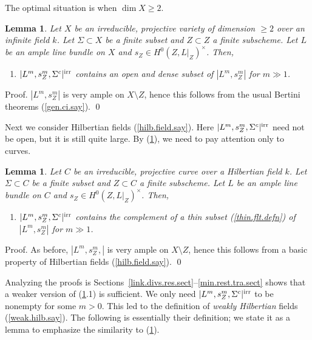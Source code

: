 \documentclass{amsart}
\newtheorem{lem}[thm]{Lemma}
\theoremstyle{definition}
\theoremstyle{remark}
\begin{document}
The optimal situation is when $\dim X\geq 2$.



\begin{lem}\label{bert.f.basic.prop.lem} Let $X$ be an irreducible,  projective variety of dimension $\geq 2$ over an infinite field $k$. Let $\Sigma\subset X$ be a finite subset and $Z\subset Z$ a finite subscheme. Let $L$ be an ample  line bundle on $X$ and  $s_Z\in H^0(Z, L|_Z)^\times$. Then, 
\begin{enumerate}
\item $|L^m, s^m_Z, \Sigma^c|^{\rm irr}$ contains an open and dense subset of $ |L^m, s^m_Z|$ for $m\gg 1$.
\end{enumerate}
\end{lem}

Proof.  $ |L^m, s^m_Z|$ is very ample on  $X\setminus Z$, hence
this follows from the usual Bertini theorems (\ref{gen.ci.say}).
\qed

\medskip

Next we consider Hilbertian  fields  (\ref{hilb.field.say}).
Here $|L^m, s^m_Z, \Sigma^c|^{\rm irr}$ need not be open, but it is still quite large. By (\ref{bert.f.basic.prop.lem}), we need to pay attention only to curves.


\begin{lem}\label{hilb.f.basic.prop.lem}  Let $C$ be an irreducible,    projective curve over a Hilbertian  field $k$. Let $\Sigma\subset C$ be a finite subset and $Z\subset C$ a finite subscheme. Let $L$ be an ample  line bundle on $C$ and  $s_Z\in H^0(Z, L|_Z)^\times$. Then, 
\begin{enumerate}
\item $|L^m, s^m_Z, \Sigma^c|^{\rm irr}$ contains the complement of a thin  subset  (\ref{thin.flt.defn}) of $ |L^m, s^m_Z|$ for $m\gg 1$.
\end{enumerate}
\end{lem}

Proof. As before, $ |L^m, s^m_Z,|$ is very ample on  $X\setminus Z$, hence
this follows from a basic property of Hilbertian fields 
(\ref{hilb.field.say}). \qed

\medskip

Analyzing the proofs is Sections~\ref{link.divs.res.sect}--\ref{min.rest.tra.sect}
shows that  a weaker version of (\ref{hilb.f.basic.prop.lem}.1) 
is sufficient. We only need $|L^m, s^m_Z, \Sigma^c|^{\rm irr}$ to be nonempty for some $m>0$. This led to the definition of
{\it weakly Hilbertian}  fields  (\ref{weak.hilb.say}). 
The following is essentially their definition; we state it as a lemma to emphasize the similarity to (\ref{hilb.f.basic.prop.lem}). 
\end{document}
